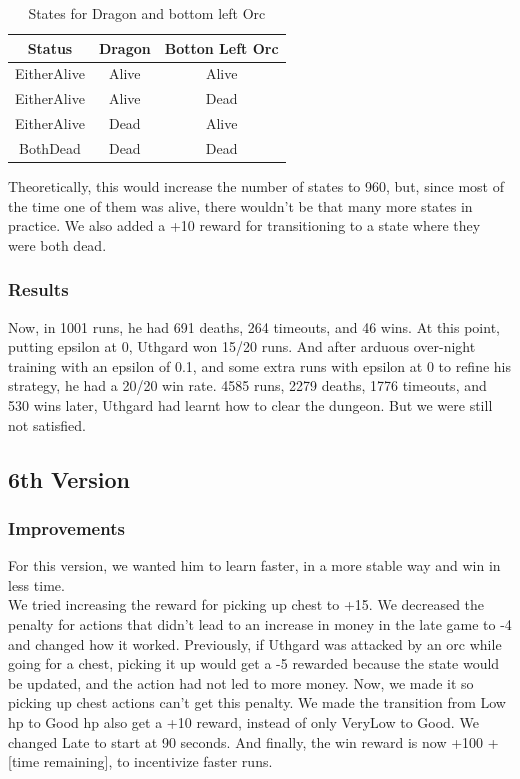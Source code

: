 \documentclass{article}
\begin{document}
  \begin{table}[h!]
    \centering
    \caption{States for Dragon and bottom left Orc}
    \label{tab:enemiesStates}
    \begin{tabular}{c|c|c}
      \textbf{Status} & \textbf{Dragon} & \textbf{Botton Left Orc}\\
      \hline
      EitherAlive & Alive & Alive\\
      EitherAlive & Alive & Dead\\
      EitherAlive & Dead & Alive\\
      BothDead & Dead & Dead\\
    \end{tabular}
  \end{table}
  \noindent
  Theoretically, this would increase the number of states to 960, but, since most of the time one of them was alive, there wouldn't be that many more states in practice. 
  We also added a +10 reward for transitioning to a state where they were both dead.

  \subsubsection{Results}

  Now, in 1001 runs, he had 691 deaths, 264 timeouts, and 46 wins. At this point, putting epsilon at 0, Uthgard won 15/20 runs. And after arduous over-night training with an epsilon of 0.1, and some extra runs with epsilon at 0 to refine his strategy, he had a 20/20 win rate. 
  4585 runs, 2279 deaths, 1776 timeouts, and 530 wins later, Uthgard had learnt how to clear the dungeon. But we were still not satisfied.

  \subsection{6th Version}

  \subsubsection{Improvements}

  For this version, we wanted him to learn faster, in a more stable way and win in less time.\\
  We tried increasing the reward for picking up chest to +15. We decreased the penalty for actions that didn't lead to an increase in money in the late game to -4 and changed how it worked. Previously, if Uthgard was attacked by an orc while going for a chest, picking it up would get a -5 rewarded because the state would be updated, and the action had not led to more money. 
  Now, we made it so picking up chest actions can't get this penalty. We made the transition from Low hp to Good hp also get a +10 reward, instead of only VeryLow to Good. We changed Late to start at 90 seconds. And finally, the win reward is now +100 + [time remaining], to incentivize faster runs.
\end{document}

